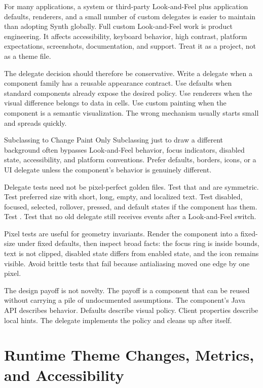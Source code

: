 For many applications, a system or third-party Look-and-Feel plus application defaults, renderers, and a small number of custom delegates is easier to maintain than adopting Synth globally. Full custom Look-and-Feel work is product engineering. It affects accessibility, keyboard behavior, high contrast, platform expectations, screenshots, documentation, and support. Treat it as a project, not as a theme file.

The delegate decision should therefore be conservative. Write a delegate when a component family has a reusable appearance contract. Use defaults when standard components already expose the desired policy. Use renderers when the visual difference belongs to data in cells. Use custom painting when the component is a semantic visualization. The wrong mechanism usually starts small and spreads quickly.

\begin{pitfallbox}{Subclassing to Change Paint Only}
Subclassing  just to draw a different background often bypasses Look-and-Feel behavior, focus indicators, disabled state, accessibility, and platform conventions. Prefer defaults, borders, icons, or a UI delegate unless the component's behavior is genuinely different.
\end{pitfallbox}

Delegate tests need not be pixel-perfect golden files. Test that  and  are symmetric. Test preferred size with short, long, empty, and localized text. Test disabled, focused, selected, rollover, pressed, and default states if the component has them. Test . Test that no old delegate still receives events after a Look-and-Feel switch.

Pixel tests are useful for geometry invariants. Render the component into a fixed-size  under fixed defaults, then inspect broad facts: the focus ring is inside bounds, text is not clipped, disabled state differs from enabled state, and the icon remains visible. Avoid brittle tests that fail because antialiasing moved one edge by one pixel.

The design payoff is not novelty. The payoff is a component that can be reused without carrying a pile of undocumented assumptions. The component's Java API describes behavior. Defaults describe visual policy. Client properties describe local hints. The delegate implements the policy and cleans up after itself.

\section{Runtime Theme Changes, Metrics, and Accessibility}

